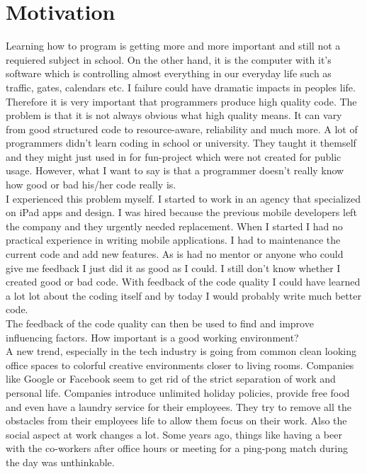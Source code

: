 \section{Motivation}
Learning how to program is getting more and more important and still not a requiered subject in school. On the other hand, it is the computer with it's software which is controlling almost everything in our everyday life such as traffic, gates, calendars etc. I failure could have dramatic impacts in peoples life.\\
Therefore it is very important that programmers produce high quality code. The problem is that it is not always obvious what high quality means. It can vary from good structured code to resource-aware, reliability and much more. A lot of programmers didn't learn coding in school or university. They taught it themself and they might just used in for fun-project which were not created for public usage. However, what I want to say is that a programmer doesn't really know how good or bad his/her code really is.\\
I experienced this problem myself.
I started to work in an agency that specialized on iPad apps and design. I was hired because the previous mobile developers left the company and they urgently needed replacement. When I started I had no practical experience in writing mobile applications. I had to maintenance the current code and add new features. As is had no mentor or anyone who could give me feedback I just did it as good as I could. I still don't know whether I created good or bad code. With feedback of the code quality I could have learned a lot lot about the coding itself and by today I would probably write much better code.\\
The feedback of the code quality can then be used to find and improve influencing factors. 
How important is a good working environment?\\
A new trend, especially in the tech industry is going from common clean looking office spaces to colorful creative environments closer to living rooms. Companies like Google or Facebook seem to get rid of the strict separation of work and personal life. Companies introduce unlimited holiday policies, provide free food and even have a laundry service for their employees. They try to remove all the obstacles from their employees life to allow them focus on their work. 
Also the social aspect at work changes a lot. Some years ago, things like having a beer with the co-workers after office hours or meeting for a ping-pong match during the day was unthinkable. 
